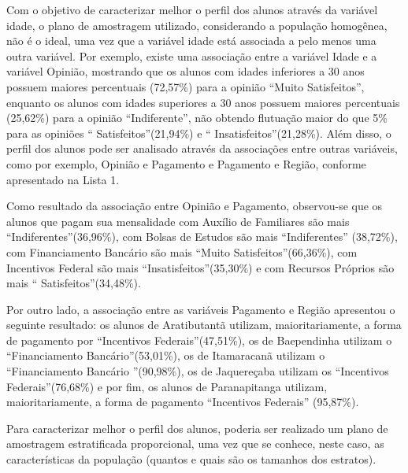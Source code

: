	Com o objetivo de caracterizar melhor o perfil dos alunos através da
	variável idade, o plano de amostragem utilizado, considerando a
	população homogênea, não é o ideal, uma vez que a variável idade está
	associada a pelo menos uma outra variável. Por exemplo, existe uma
	associação entre a variável Idade e a variável Opinião, mostrando que os
	alunos com idades inferiores a 30 anos possuem maiores percentuais
	(72,57\%) para a opinião \textquotedblleft Muito
	Satisfeitos\textquotedblright, enquanto os alunos com idades superiores
	a 30 anos possuem maiores percentuais (25,62\%) para a opinião
	\textquotedblleft Indiferente\textquotedblright, não obtendo flutuação
	maior do que 5\% para as opiniões \textquotedblleft
	Satisfeitos\textquotedblright (21,94\%) e \textquotedblleft
	Insatisfeitos\textquotedblright (21,28\%). Além disso, o perfil dos
	alunos pode ser analisado através da associações entre outras variáveis,
	como por exemplo, Opinião e Pagamento e Pagamento e Região, conforme
	apresentado na Lista 1. 

	Como resultado da associação entre Opinião e Pagamento, observou-se que
	os alunos que pagam sua mensalidade com Auxílio de Familiares são mais
	\textquotedblleft Indiferentes\textquotedblright (36,96\%), com Bolsas
	de Estudos são mais \textquotedblleft Indiferentes\textquotedblright
	(38,72\%), com Financiamento Bancário são mais \textquotedblleft Muito
	Satisfeitos\textquotedblright (66,36\%), com Incentivos Federal são mais
	\textquotedblleft Insatisfeitos\textquotedblright (35,30\%) e com
	Recursos Próprios são mais \textquotedblleft
	Satisfeitos\textquotedblright (34,48\%).

	Por outro lado, a associação entre as variáveis Pagamento e Região
	apresentou o seguinte resultado: os alunos de Aratibutantã utilizam,
	maioritariamente, a forma de pagamento por \textquotedblleft Incentivos
	Federais\textquotedblright (47,51\%), os de Baependinha utilizam o
	\textquotedblleft Financiamento Bancário\textquotedblright (53,01\%), os
	de Itamaracanã utilizam o \textquotedblleft Financiamento Bancário
	\textquotedblright (90,98\%), os de Jaquereçaba utilizam os
	\textquotedblleft Incentivos Federais\textquotedblright (76,68\%) e por
	fim, os alunos de Paranapitanga utilizam, maioritariamente, a forma de
	pagamento \textquotedblleft Incentivos Federais\textquotedblright
	(95,87\%). 

	Para caracterizar melhor o perfil dos alunos, poderia ser realizado um
	plano de amostragem estratificada proporcional, uma vez que se conhece,
	neste caso, as características da população (quantos e quais são os
	tamanhos dos estratos). 
